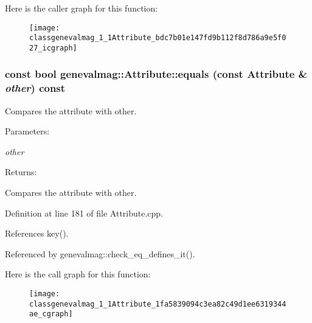Here is the caller graph for this function:\nopagebreak
\begin{figure}[H]
\begin{center}
\leavevmode
\texttt{[image: classgenevalmag\_1\_1Attribute\_bdc7b01e147fd9b112f8d786a9e5f027\_icgraph]}
\end{center}
\end{figure}
\hypertarget{classgenevalmag_1_1Attribute_1fa5839094c3ea82c49d1ee6319344ae}{
\subsubsection[{equals}]{\setlength{\rightskip}{0pt plus 5cm}const bool genevalmag::Attribute::equals (const {\bf Attribute} \& {\em other}) const}}
\label{classgenevalmag_1_1Attribute_1fa5839094c3ea82c49d1ee6319344ae}


Compares the attribute with other. \begin{Desc}
\item[Parameters:]
\begin{description}
\item[{\em other}]\end{description}
\end{Desc}
\begin{Desc}
\item[Returns:]\end{Desc}
Compares the attribute with other. 

Definition at line 181 of file Attribute.cpp.

References key().

Referenced by genevalmag::check\_\-eq\_\-defines\_\-it().

Here is the call graph for this function:\nopagebreak
\begin{figure}[H]
\begin{center}
\leavevmode
\texttt{[image: classgenevalmag\_1\_1Attribute\_1fa5839094c3ea82c49d1ee6319344ae\_cgraph]}
\end{center}
\end{figure}


